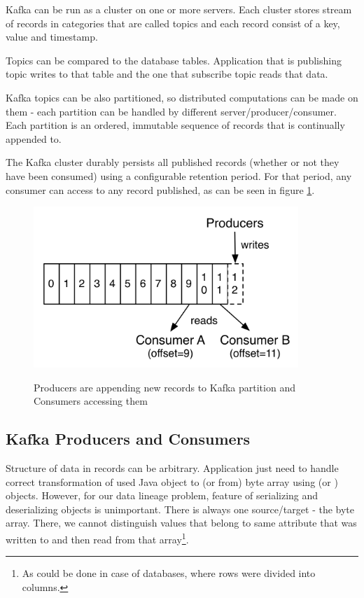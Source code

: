 Kafka can be run as a cluster on one or more servers.
Each cluster stores stream of records in categories that are called topics
and each record consist of a key, value and timestamp.

Topics can be compared to the database tables. Application that is publishing topic
writes to that table and the one that subscribe topic reads that data.

Kafka topics can be also partitioned, so distributed computations can be made
on them - each partition can be handled by different server/producer/consumer.
Each partition is an ordered, immutable sequence of records that is
continually appended to.

The Kafka cluster durably persists all published records (whether or not they have been consumed)
using a configurable retention period. For that period, any consumer can access
to any record published, as can be seen in figure \ref{frameworks:kafka:partitions}.

\begin{figure}[h]
  \center
  \includegraphics[width=100mm]{img/kafka-partitions.png}
  \label{frameworks:kafka:partitions}
  \caption{Producers are appending new records to Kafka partition and Consumers accessing them}
\end{figure}



\subsection{Kafka Producers and Consumers}


Structure of data in records can be arbitrary. Application just need to handle
correct transformation of used Java object to (or from) byte array using
 (or ) objects.
However, for our data lineage problem, feature of serializing
and deserializing objects is unimportant. There is always one
source/target - the byte array. There, we cannot distinguish values
that belong to same attribute that was written to and then read from that array\footnote{
  As could be done in case of databases, where rows were divided into columns.
}.

